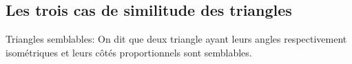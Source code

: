 \documentclass[a4paper,12pt]{article}
\begin{document}
\pagebreak
\subsection{Les trois cas de similitude des triangles}
\begin{definition}{Triangles semblables:}
On dit que deux triangle ayant leurs angles respectivement isométriques et leurs côtés proportionnels sont semblables.
\end{definition}
\end{document}

